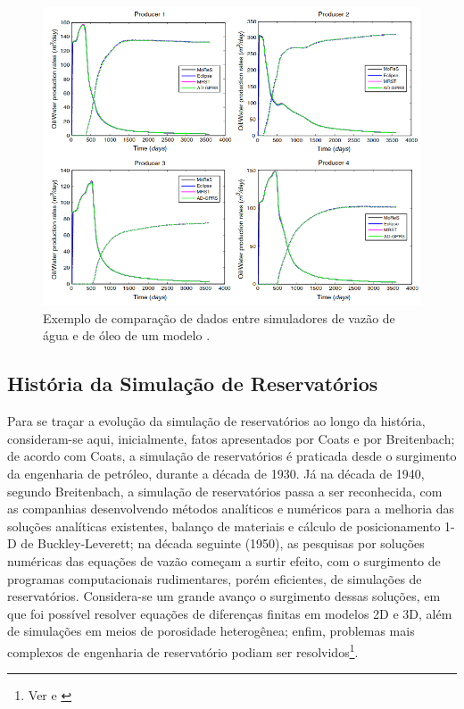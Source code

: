 \begin{figure}[H]
\centering
\includegraphics[width=.9\textwidth]{figs/revisao/revisao_simuex.png}
\caption{Exemplo de compara\c{c}\~{a}o de dados entre simuladores de vaz\~{a}o de \'{a}gua e de \'{o}leo de um modelo \cite{eggM}.}\label{fig:rev_simuex}
\end{figure}

\subsection{Hist\'{o}ria da Simula\c{c}\~{a}o de Reservat\'{o}rios}
Para se tra\c{c}ar a evolu\c{c}\~{a}o da simula\c{c}\~{a}o de reservat\'{o}rios ao longo da hist\'{o}ria, consideram-se aqui, inicialmente, fatos apresentados por Coats e por Breitenbach; de acordo com Coats, a simula\c{c}\~{a}o de reservat\'{o}rios \'{e} praticada desde o surgimento da engenharia de petr\'{o}leo, durante a d\'{e}cada de 1930. J\'{a} na d\'{e}cada de 1940, segundo Breitenbach, a simula\c{c}\~{a}o de reservat\'{o}rios passa a ser reconhecida, com as companhias desenvolvendo m\'{e}todos anal\'{i}ticos e num\'{e}ricos para a melhoria das solu\c{c}\~{o}es anal\'{i}ticas existentes, balan\c{c}o de materiais e c\'{a}lculo de posicionamento 1-D de Buckley-Leverett; na d\'{e}cada seguinte (1950), as pesquisas por solu\c{c}\~{o}es num\'{e}ricas das equa\c{c}\~{o}es de vaz\~{a}o come\c{c}am a surtir efeito, com o surgimento de programas computacionais rudimentares, por\'{e}m eficientes, de simula\c{c}\~{o}es de reservat\'{o}rios. Considera-se um grande avan\c{c}o o surgimento dessas solu\c{c}\~{o}es, em que foi poss\'{i}vel resolver equa\c{c}\~{o}es de diferen\c{c}as finitas em modelos 2D e 3D, al\'{e}m de simula\c{c}\~{o}es em meios de porosidade heterog\^{e}nea; enfim, problemas mais complexos de engenharia de reservat\'{o}rio podiam ser resolvidos\footnote{Ver \cite{coats1982} e \cite{breitenbach1991}}.

